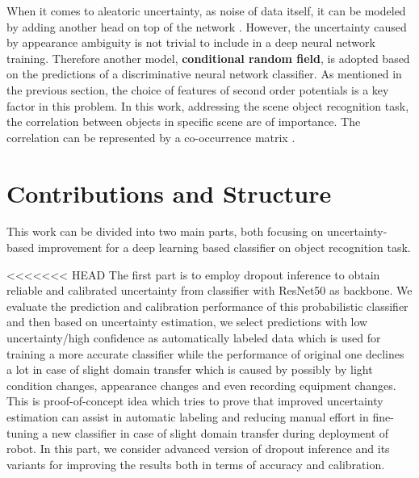 When it comes to aleatoric uncertainty, as noise of data itself, it can be modeled by adding another head on top of the network \cite{kendall2017uncertainties}. However, the uncertainty caused by appearance ambiguity is not trivial to include in a deep neural network training. Therefore another model, \textbf{conditional random field}\cite{lafferty2001conditional}, is adopted based on the predictions of a discriminative neural network classifier. As mentioned in the previous section, the choice of features of second order potentials is a key factor in this problem. In this work, addressing the scene object recognition task, the correlation between objects in specific scene are of importance. The correlation can be represented by a co-occurrence matrix \cite{ladicky2010graph}\cite{rasiwasia2009holistic}\cite{galleguillos2008object}\cite{rabinovich2007objects}.

\section{Contributions and Structure}
This work can be divided into two main parts, both focusing on uncertainty-based improvement for a deep learning based classifier on object recognition task. 

<<<<<<< HEAD
The first part is to employ dropout inference to obtain reliable and calibrated uncertainty from classifier with ResNet50\cite{he2016deep} as backbone. We evaluate the prediction and calibration performance of this probabilistic classifier and then based on uncertainty estimation, we select predictions with low uncertainty/high confidence as automatically labeled data which is used for training a more accurate classifier while the performance of original one declines a lot in case of slight domain transfer which is caused by possibly by light condition changes, appearance changes and even recording equipment changes. This is proof-of-concept idea which tries to prove that improved uncertainty estimation can assist in automatic labeling and reducing manual effort in fine-tuning a new classifier in case of slight domain transfer during deployment of robot. In this part, we consider advanced version of dropout inference and its variants for improving the results both in terms of accuracy and calibration. 

